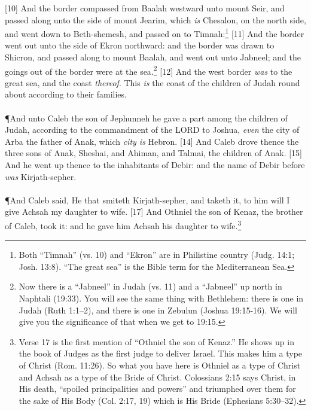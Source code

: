 [10] \textcolor[rgb]{0.00,0.00,1.00}{And the border compassed from Baalah westward unto mount Seir, and passed along unto the side of mount Jearim, which \emph{is} Chesalon, on the north side, and went down to Beth-shemesh, and passed on to Timnah:}\footnote{Both “Timnah” (vs. 10) and “Ekron” are
in Philistine country (Judg. 14:1; Josh. 13:8).
“The great sea” is the Bible term for the
Mediterranean Sea.}
[11] \textcolor[rgb]{0.00,0.00,1.00}{And the border went out unto the side of Ekron northward: and the border was drawn to Shicron, and passed along to mount Baalah, and went out unto Jabneel; and the goings out of the border were at the sea.}\footnote{Now there is a “Jabneel” in Judah (vs. 11)
and a “Jabneel” up north in Naphtali (19:33).
You will see the same thing with Bethlehem: there is one in Judah (Ruth 1:1--2), and there is one in Zebulun (Joshua 19:15-16). We will give you the significance of that when we get to 19:15.}
[12] \textcolor[rgb]{0.00,0.00,1.00}{And the west border \emph{was} to the great sea, and the coast \emph{thereof}. This \emph{is} the coast of the children of Judah round about according to their families.}\\
\\
\P \textcolor[rgb]{0.00,0.00,1.00}{And unto Caleb the son of Jephunneh he gave a part among the children of Judah, according to the commandment of the LORD to Joshua, \emph{even} the city of Arba the father of Anak, which \emph{city is} Hebron.}
[14] \textcolor[rgb]{0.00,0.00,1.00}{And Caleb drove thence the three sons of Anak, Sheshai, and Ahiman, and Talmai, the children of Anak.}
[15] \textcolor[rgb]{0.00,0.00,1.00}{And he went up thence to the inhabitants of Debir: and the name of Debir before \emph{was} Kirjath-sepher.}\\
\\
\P \textcolor[rgb]{0.00,0.00,1.00}{And Caleb said, He that smiteth Kirjath-sepher, and taketh it, to him will I give Achsah my daughter to wife.}
[17] \textcolor[rgb]{0.00,0.00,1.00}{And Othniel the son of Kenaz, the brother of Caleb, took it: and he gave him Achsah his daughter to wife.}\footnote{Verse 17 is the first mention of “Othniel
the son of Kenaz.” He shows up in the book of
Judges as the first judge to deliver Israel. This
makes him a type of Christ (Rom. 11:26). So
what you have here is Othniel as a type of
Christ and Achsah as a type of the Bride of
Christ. Colossians 2:15 says Christ, in His
death, “spoiled principalities and powers”
and triumphed over them for the sake of His
Body (Col. 2:17, 19) which is His Bride (Ephesians 5:30--32).}
